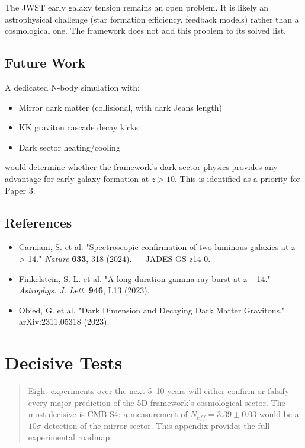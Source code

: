 \documentclass[aps,prd,preprint,superscriptaddress,longbibliography]{revtex4-2}
\begin{document}
The JWST early galaxy tension remains an open problem. It is likely an astrophysical challenge (star formation efficiency, feedback models) rather than a cosmological one. The framework does not add this problem to its solved list.



\subsection{Future Work}

A dedicated N-body simulation with:

\begin{itemize}
  \item Mirror dark matter (collisional, with dark Jeans length)
  \item KK graviton cascade decay kicks
  \item Dark sector heating/cooling
\end{itemize}

would determine whether the framework's dark sector physics provides any advantage for early galaxy formation at $z > 10$. This is identified as a priority for Paper 3.



\subsection{References}


\begin{itemize}
  \item Carniani, S. et al. "Spectroscopic confirmation of two luminous galaxies at z > 14." \textit{Nature} \textbf{633}, 318 (2024). --- JADES-GS-z14-0.
  \item Finkelstein, S. L. et al. "A long-duration gamma-ray burst at z ~ 14." \textit{Astrophys. J. Lett.} \textbf{946}, L13 (2023).
  \item Obied, G. et al. "Dark Dimension and Decaying Dark Matter Gravitons." arXiv:2311.05318 (2023).
\end{itemize}


\section{Decisive Tests}


\begin{quote}
Eight experiments over the next 5--10 years will either confirm
or falsify every major prediction of the 5D framework's
cosmological sector. The most decisive is CMB-S4: a measurement
of $N_{eff} = 3.39 \pm 0.03$ would be a $10\sigma$ detection of the mirror
sector. This appendix provides the full experimental roadmap.
\end{quote}
\end{document}
